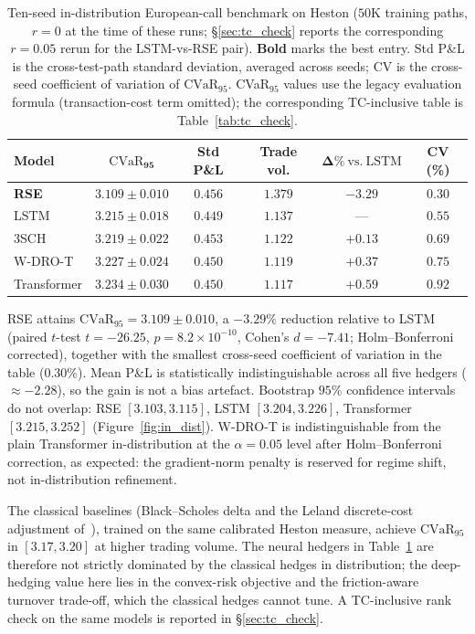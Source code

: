 \documentclass[10pt,letterpaper]{article}
\newcommand{\cvar}{\mathrm{CVaR}}
\begin{document}
\begin{table}[ht]
\centering\small
\caption{Ten-seed in-distribution European-call benchmark on Heston
($50$K training paths, $r=0$ at the time of these runs;
\S\ref{sec:tc_check} reports the corresponding $r=0.05$ rerun for
the LSTM-vs-RSE pair). \textbf{Bold} marks the best entry. Std P\&L
is the cross-test-path standard deviation, averaged across seeds; CV
is the cross-seed coefficient of variation of $\cvar_{95}$. CVaR$_{95}$
values use the legacy evaluation formula (transaction-cost term
omitted); the corresponding TC-inclusive table is
Table~\ref{tab:tc_check}.}
\label{tab:main}
\begin{tabular}{@{}lccccc@{}}
\toprule
\textbf{Model} & $\boldsymbol{\cvar_{95}}$ & \textbf{Std P\&L}
& \textbf{Trade vol.} & $\boldsymbol{\Delta\%\ \mathrm{vs.\ LSTM}}$ & \textbf{CV (\%)} \\\midrule
\textbf{RSE}    & $\mathbf{3.109\pm 0.010}$ & $0.456$ & $1.379$ & $\mathbf{-3.29}$ & $\mathbf{0.30}$ \\
LSTM            & $3.215\pm 0.018$         & $0.449$ & $1.137$ & ---              & $0.55$ \\
3SCH            & $3.219\pm 0.022$         & $0.453$ & $1.122$ & $+0.13$          & $0.69$ \\
W-DRO-T         & $3.227\pm 0.024$         & $0.450$ & $1.119$ & $+0.37$          & $0.75$ \\
Transformer     & $3.234\pm 0.030$         & $0.450$ & $1.117$ & $+0.59$          & $0.92$ \\
\bottomrule
\end{tabular}
\end{table}

RSE attains $\cvar_{95}=3.109\pm 0.010$, a $-3.29\%$ reduction
relative to LSTM (paired $t$-test $t=-26.25$,
$p=8.2\times 10^{-10}$, Cohen's $d=-7.41$; Holm--Bonferroni
corrected), together with the smallest cross-seed coefficient of
variation in the table ($0.30\%$). Mean P\&L is statistically
indistinguishable across all five hedgers ($\approx -2.28$), so the
gain is not a bias artefact. Bootstrap $95\%$ confidence intervals
do not overlap: RSE $[3.103,3.115]$, LSTM $[3.204,3.226]$,
Transformer $[3.215,3.252]$ (Figure~\ref{fig:in_dist}). W-DRO-T is
indistinguishable from the plain Transformer in-distribution at the
$\alpha=0.05$ level after Holm--Bonferroni correction, as expected:
the gradient-norm penalty is reserved for regime shift, not
in-distribution refinement.

The classical baselines (Black--Scholes delta and the Leland
discrete-cost adjustment of~\citet{leland1985option}), trained on
the same calibrated Heston measure, achieve $\cvar_{95}$ in
$[3.17,3.20]$ at higher trading volume. The neural hedgers in
Table~\ref{tab:main} are therefore not strictly dominated by the
classical hedges in distribution; the deep-hedging value here lies
in the convex-risk objective and the friction-aware turnover
trade-off, which the classical hedges cannot tune. A TC-inclusive
rank check on the same models is reported in
\S\ref{sec:tc_check}.
\end{document}
